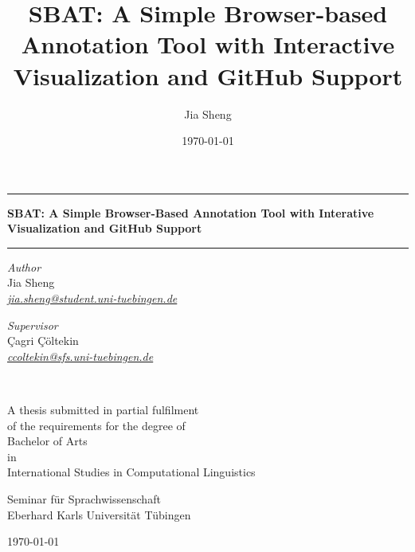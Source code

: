 \documentclass[12ptm a4paper]{article}
\title{SBAT: A Simple Browser-based Annotation Tool with Interactive Visualization and GitHub Support}
\author{Jia Sheng}
\date{\today}
\begin{document}
\begin{titlepage}
\begin{center}

\hrule
\vspace{0.6cm}
{\bfseries\LARGE
SBAT: A Simple Browser-Based Annotation Tool with Interative Visualization and GitHub Support
}\\[1cm]
\hrule
\vspace*{.05\textheight}
 
\begin{minipage}[t]{0.49\textwidth}
\begin{flushleft}
{\large
\textit{Author}\\
Jia Sheng}\\
\href{mailto:jia.sheng@student.uni-tuebingen.de}{\textit{jia.sheng@student.uni-tuebingen.de}}\\
\end{flushleft}
\end{minipage}
\begin{minipage}[t]{0.49\textwidth}
\begin{flushright}
{\large
\textit{Supervisor}\\
Çagri Çöltekin}\\
\href{mailto:ccoltekin@sfs.uni-tuebingen.de}{\textit{ccoltekin@sfs.uni-tuebingen.de}}\\
\end{flushright}
\end{minipage}\\

\vfill

A thesis submitted in partial fulfilment\\
of the requirements for the degree of\\[2mm]
{\large Bachelor of Arts}\\
in\\[1mm]
{\large International Studies in Computational Linguistics}

\vspace*{.1\textheight}

{\large Seminar für Sprachwissenschaft\\
Eberhard Karls Universität Tübingen

\vspace{1em}
\today}
\end{center}
\end{titlepage}

\end{document}
